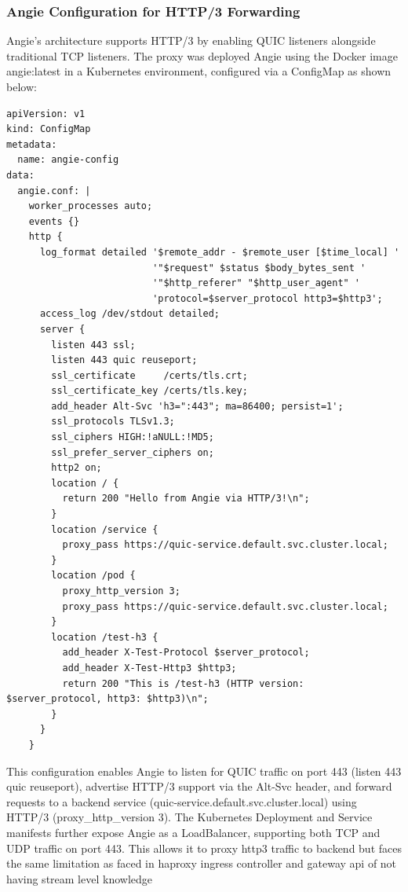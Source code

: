 \subsubsection{Angie Configuration for HTTP/3 Forwarding}
Angie's architecture supports HTTP/3 by enabling QUIC listeners alongside traditional TCP listeners. The proxy was deployed Angie using the Docker image angie:latest in a Kubernetes environment, configured via a ConfigMap as shown below:

\begin{lstlisting}[breaklines=true,basicstyle=\small\ttfamily,frame=single]
apiVersion: v1
kind: ConfigMap
metadata:
  name: angie-config
data:
  angie.conf: |
    worker_processes auto;
    events {}
    http {
      log_format detailed '$remote_addr - $remote_user [$time_local] '
                          '"$request" $status $body_bytes_sent '
                          '"$http_referer" "$http_user_agent" '
                          'protocol=$server_protocol http3=$http3';
      access_log /dev/stdout detailed;
      server {
        listen 443 ssl;
        listen 443 quic reuseport;
        ssl_certificate     /certs/tls.crt;
        ssl_certificate_key /certs/tls.key;
        add_header Alt-Svc 'h3=":443"; ma=86400; persist=1';
        ssl_protocols TLSv1.3;
        ssl_ciphers HIGH:!aNULL:!MD5;
        ssl_prefer_server_ciphers on;
        http2 on;
        location / {
          return 200 "Hello from Angie via HTTP/3!\n";
        }
        location /service {
          proxy_pass https://quic-service.default.svc.cluster.local;
        }
        location /pod {
          proxy_http_version 3;
          proxy_pass https://quic-service.default.svc.cluster.local;
        }
        location /test-h3 {
          add_header X-Test-Protocol $server_protocol;
          add_header X-Test-Http3 $http3;
          return 200 "This is /test-h3 (HTTP version: $server_protocol, http3: $http3)\n";
        }
      }
    }
\end{lstlisting}

This configuration enables Angie to listen for QUIC traffic on port 443 (listen 443 quic reuseport), advertise HTTP/3 support via the Alt-Svc header, and forward requests to a backend service (quic-service.default.svc.cluster.local) using HTTP/3 (proxy\_http\_version 3). The Kubernetes Deployment and Service manifests further expose Angie as a LoadBalancer, supporting both TCP and UDP traffic on port 443.
This allows it to proxy http3 traffic to backend but faces the same limitation as faced in haproxy ingress controller and gateway api of not having stream level knowledge

